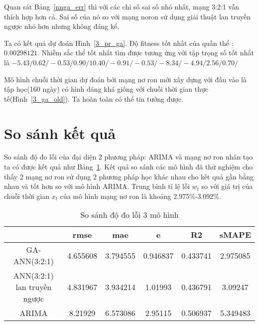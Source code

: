 Quan sát Bảng~\ref{nnga_err} thì với các chỉ số sai số nhỏ nhất, mạng 3:2:1 vẫn thích hợp hơn cả. Sai số của nó so với mạng noron sử dụng giải thuật lan truyền ngược nhỏ hơn nhưng không đáng kể.

Ta có kết quả dự đoán Hình~\ref{3_pr_ga}.
Độ fitness tốt nhất của quần thể : $0.00298121$. Nhiễm sắc thể tốt nhất tìm được tương ứng với tập trọng số tốt nhất là $-5.43/0.62/-0.53/0.90/10.40/-0.91/-0.53/-8.34/-4.94/2.56/0.70/$

Mô hình chuỗi thời gian dự đoán bởi mạng nơ ron mới xây dựng với đầu vào là tập học(160 ngày) có hình dáng khá giống với chuỗi thời gian thực tế(Hình~\ref{3_ga_old}). Ta hoàn toàn có thể tin tưởng được.

\section{So sánh kết quả}
So sánh độ đo lỗi của đại diện 2 phương pháp: ARIMA và mạng nơ ron nhân tạo ta có được kết quả như Bảng~\ref{ss}. Kết quả so sánh các mô hình đã thử nghiệm cho thấy 2 mạng nơ ron sử dụng 2 phương pháp học khác nhau cho kết quả gần bằng nhau và tốt hơn so với mô hình ARIMA. Trung bình tỉ lệ lỗi $w_t$ so với giá trị của chuỗi thời gian $x_t$ của mô hình mạng nơ ron là khoảng 2.975\%-3.092\%.

\begin{table}[htbp]
  \centering
  \caption{So sánh độ đo lỗi 3 mô hình}
    \begin{tabular}{crcccc}
          & \multicolumn{1}{c}{rmse} & mae   & e     & R2    & sMAPE \\ \hline
    GA-ANN(3:2:1) & \multicolumn{1}{c}{4.655608} & 3.794555 & 0.946837 & 0.433741 & 2.975085 \\
    ANN(3:2:1) lan truyền ngược & 4.831967 & 3.934214 & 1.01993 & 0.436791 & 3.09247 \\
    ARIMA & \multicolumn{1}{c}{8.21929} & 6.573086 & 2.95115 & 0.506937 & 5.349483 \\
    \end{tabular}%
  \label{ss}%
\end{table}%

